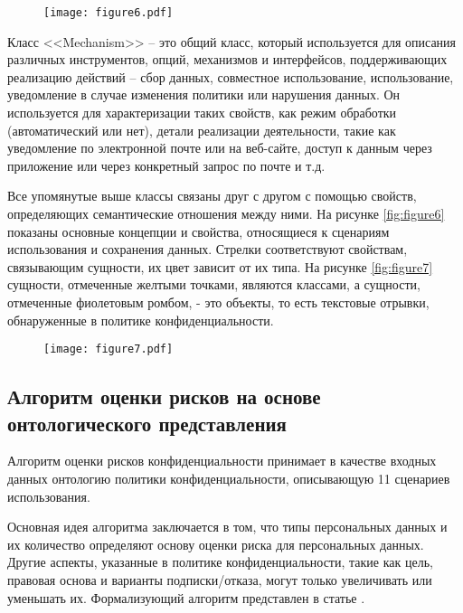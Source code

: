 \documentclass[../main]{subfiles}
\begin{document}
\begin{figure}[H]
    \centering
    {\texttt{[image: figure6.pdf]}}
    \vspace{-\baselineskip}
\end{figure}

Класс <<Mechanism>> -- это общий класс, который используется для описания различных инструментов, опций, механизмов и интерфейсов, поддерживающих реализацию действий -- сбор данных, совместное использование, использование, уведомление в случае изменения политики или нарушения данных. Он используется для характеризации таких свойств, как режим обработки (автоматический или нет), детали реализации деятельности, такие как уведомление по электронной почте или на веб-сайте, доступ к данным через приложение или через конкретный запрос по почте и т.д.

Все упомянутые выше классы связаны друг с другом с помощью свойств, определяющих семантические отношения между ними. На рисунке \ref{fig:figure6} показаны основные концепции и свойства, относящиеся к сценариям использования и сохранения данных. Стрелки соответствуют свойствам, связывающим сущности, их цвет зависит от их типа. На рисунке \ref{fig:figure7} сущности, отмеченные желтыми точками, являются классами, а сущности, отмеченные фиолетовым ромбом, - это объекты, то есть текстовые отрывки, обнаруженные в политике конфиденциальности.

\begin{figure}[H]
    \centering
    {\texttt{[image: figure7.pdf]}}
    \vspace{-\baselineskip}
\end{figure}

\subsection{Алгоритм оценки рисков на основе онтологического представления}
Алгоритм оценки рисков конфиденциальности принимает в качестве входных данных онтологию политики конфиденциальности, описывающую 11 сценариев использования.

Основная идея алгоритма заключается в том, что типы персональных данных и их количество определяют основу оценки риска для персональных данных. Другие аспекты, указанные в политике конфиденциальности, такие как цель, правовая основа и варианты подписки/отказа, могут только увеличивать или уменьшать их. Формализующий алгоритм представлен в статье \cite{P2Onto}.
\end{document}
